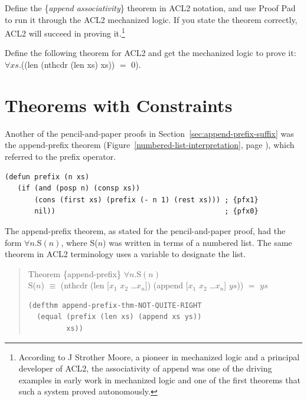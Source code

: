 \begin{ExerciseList}

\Exercise Define the
\{\emph{append associativity}\}
theorem in ACL2 notation,
and use Proof Pad to run it through the ACL2 mechanized logic.
If you state the theorem correctly, ACL2 will succeed in proving it.\footnote{According
to J Strother Moore, a pioneer
in mechanized logic and a principal developer of ACL2,
the associativity of append was one of the driving examples in early work in
mechanized logic and one of the first theorems that such a system proved autonomously.}

\Exercise Define the following theorem for ACL2 and get the mechanized logic to prove it:
$\forall xs.$((len (nthcdr (len xs) xs)) $=$ 0).

\end{ExerciseList}

\section{Theorems with Constraints}
\label{sec:implies-constraints}

Another of the pencil-and-paper proofs in Section~\ref{sec:append-prefix-suffix}
was the append-prefix theorem
(Figure~\ref{numbered-list-interpretation}, page \pageref{numbered-list-interpretation}),
which referred to the prefix operator.

\begin{Verbatim}
(defun prefix (n xs)
   (if (and (posp n) (consp xs))
       (cons (first xs) (prefix (- n 1) (rest xs))) ; {pfx1}
       nil))                                        ; {pfx0}
\end{Verbatim}

The append-prefix theorem, as stated for the pencil-and-paper proof,
had the form $\forall n.$S$(n)$,
where S($n$)
was written in terms of a numbered list.
The same theorem in ACL2 terminology uses a variable to designate the list.
\begin{samepage}
\begin{quote}
Theorem \{append-prefix\} $\forall n.$S$(n)$ \\
S($n$) $\equiv$ (nthcdr (len [$x_1$ $x_2$ \dots $x_n$]) (append [$x_1$ $x_2$ \dots $x_n$] $ys$)) $=$ $ys$
\begin{Verbatim}
(defthm append-prefix-thm-NOT-QUITE-RIGHT
  (equal (prefix (len xs) (append xs ys))
         xs))
\end{Verbatim}
\end{quote}
\end{samepage}

